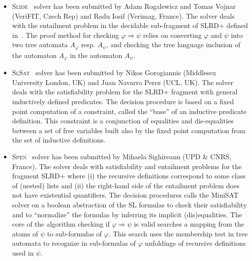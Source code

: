 \documentclass[twoside,11pt]{article}
\newcommand{\limp}{\Rightarrow}
\newcommand{\SLIDE}{\textsc{Slide}}
\newcommand{\SLSAT}{\textsc{SlSat}}
\newcommand{\SPEN}{\textsc{Spen}}
\begin{document}
\begin{itemize}
\item \SLIDE~\cite{IosifRV14,SLIDEsite} 
solver has been submitted by 
Adam Rogalewicz and Tomas Vojnar (VeriFIT, Czech Rep) and
Radu Iosif (Verimag, France).
The solver deals with the entailment problem in the decidable sub-fragment of SLRD+ defined in~\cite{IosifRS13}.
The proof method for checking $\varphi\limp\psi$ relies on converting $\varphi$ and $\psi$ into two tree automata $A_\varphi$ resp. $A_\psi$, and checking
the tree language inclusion of the automaton $A_\varphi$ in the automaton $A_\psi$.


\item \SLSAT~\cite{BrotherstonFPG14} 
solver has been submitted by 
Nikos Gorogiannis (Middlesex University London, UK) 
and  Juan Navarro Perez (UCL, UK).
The solver deals with the satisfiability problem for the SLRD+ fragment with general inductively defined predicates.
The decision procedure is based on a fixed point computation of a constraint, called the ``base'' of an inductive predicate definition. This constraint is a conjunction of equalities and dis-equalities between a set of free variables built also by the fixed point computation from the set of inductive definitions.



\item \SPEN~\cite{EneaLSV14,SPENsite} 
solver has been submitted by 
Mihaela Sighireanu (UPD \& CNRS, France).
The solver deals with satisfiability and entailment problems for the fragment SLRD+ where 
(i) the recursive definitions correspond to some class of (nested) lists
and (ii) the right-hand side of the entailment problem does not have existential quantifiers.
The decision procedures calls the MiniSAT solver on a boolean abstraction of the SL formulas to check their satisfiability and to ``normalize'' the formulas by inferring its implicit (dis)equalities. %
The core of the algorithm checking if $\varphi\limp\psi$ is valid searches a mapping from the atoms of $\psi$ to sub-formulas of $\varphi$.
This search uses the membership test in tree automata to recognize in sub-formulas of $\varphi$ unfoldings of recursive definitions used in $\psi$.

\end{itemize}
\end{document}
